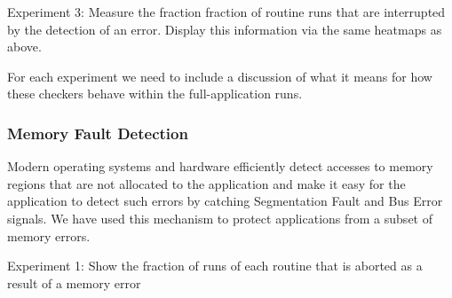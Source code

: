 \documentclass[prodmode,acmtecs]{acmconf} %
\newcommand{\greg}[1]{%
  \textcolor{blue}{GB: #1}
}
\begin{document}
Experiment 3: Measure the fraction fraction of routine runs that are interrupted by the detection of an error.
Display this information via the same heatmaps as above.

For each experiment we need to include a discussion of what it means for how these checkers behave within the full-application runs.




\subsubsection{Memory Fault Detection}
\label{sec:res_tech:err_det:mem}

Modern operating systems and hardware efficiently detect accesses to memory regions that are not allocated to the application and make it easy for the application to detect such errors by catching Segmentation Fault and Bus Error signals.
We have used this mechanism to protect applications from a subset of memory errors.


Experiment 1: Show the fraction of runs of each routine that is aborted as a result of a memory error
\end{document}
